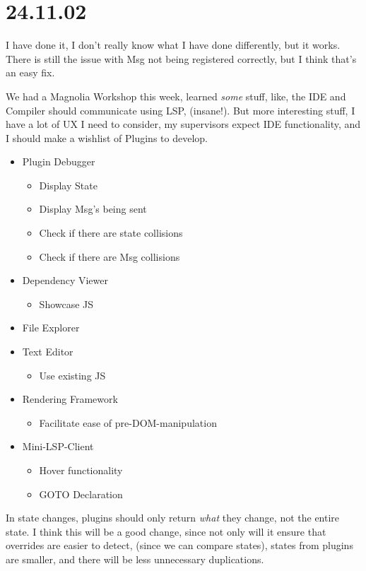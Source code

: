 \section{24.11.02}

I have done it, I don't really know what I have done differently, but it works.
There is still the issue with Msg not being registered correctly, but I think
that's an easy fix.

We had a Magnolia Workshop this week, learned \textit{some} stuff, like, the
IDE and Compiler should communicate using LSP, (insane!). But more interesting
stuff, I have a lot of UX I need to consider, my supervisors expect IDE
functionality, and I should make a wishlist of Plugins to develop.

\begin{itemize}
  \item Plugin Debugger
  \begin{itemize}
    \item Display State
    \item Display Msg's being sent
    \item Check if there are state collisions
    \item Check if there are Msg collisions
  \end{itemize}
  \item Dependency Viewer
  \begin{itemize}
    \item Showcase JS
  \end{itemize}
  \item File Explorer
  \item Text Editor
  \begin{itemize}
    \item Use existing JS
  \end{itemize}
  \item Rendering Framework
  \begin{itemize}
    \item Facilitate ease of pre-DOM-manipulation
  \end{itemize}
  \item Mini-LSP-Client
  \begin{itemize}
    \item Hover functionality
    \item GOTO Declaration
  \end{itemize}
\end{itemize}

In state changes, plugins should only return \textit{what} they change, not the
entire state. I think this will be a good change, since not only will it ensure
that overrides are easier to detect, (since we can compare states), states from
plugins are smaller, and there will be less unnecessary duplications.

